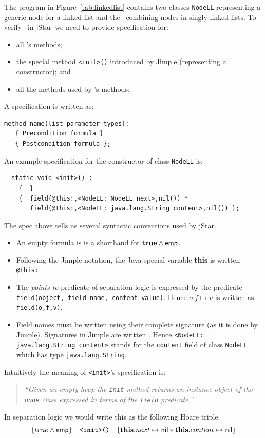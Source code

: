 \documentclass[11pt]{article}
\newcommand{\jStar}{{\sf jStar}}
\newcommand{\psto}{\mapsto}
\newcommand{\emp}{{\sf emp}}
\newcommand{\nil}{{\sf nil}}
\newcommand{\true}{\mathbf{true}}
\newcommand{\this}{\mathbf{this}}
\begin{document}
The program in Figure~\ref{tab:linkedlist} contains two classes
{\tt NodeLL}  representing a generic node for a linked list
and the \linkedlist \  combining nodes in 
singly-linked lists. To verify  \linkedlist \ in \jStar \ we
need to provide specification for:
\begin{itemize}
\item all
\linkedlist's methods;
\item the special method {\tt <init>()} introduced by Jimple
  (representing a constructor); and
\item  all the methods used by \linkedlist{}'s methods;
\end{itemize}
A specification is written as:
\begin{verbatim}
method_name(list parameter types): 
   { Precondition formula } 
   { Postcondition formula };
\end{verbatim}
An example specification for the constructor of class {\tt NodeLL} is:
\begin{verbatim}
  static void <init>() : 
    {  } 
    {  field(@this:,<NodeLL: NodeLL next>,nil()) * 
       field(@this:,<NodeLL: java.lang.String content>,nil()) };
\end{verbatim}
%
The spec above tells us several syntactic conventions used by \jStar.
\begin{itemize}
\item An empty formula is is a shorthand for $\true \wedge \emp$.
\item Following the Jimple notation, the Java special variable {\bf
    this} is written {\tt @this:}
\item The {\em points-to} predicate of separation logic is expressed by the
  predicate {\tt field(object, field name, content value)}. Hence 
  $o.f\psto v$ is written as {\tt field(o,f,v)}.
\item Field names must be written using their complete signature (as
  it is done by Jimple). Signatures in Jimple are  written {\tt <ClassName: TypeOfField NameOfField>}.
  Hence {\tt <NodeLL: java.lang.String content>} stands for the {\tt content} field of class {\tt NodeLL} 
  which has type {\tt java.lang.String}.
\end{itemize}
Intuitively the meaning of {\tt <init>}'s specification is:
\begin{quote}
\it
 ``Given an
empty heap the {\tt init} method returns an instance object of the {\tt node}
class expressed in terms of the {\tt field} predicate.''
\end{quote}
In separation
logic we would write this as the following Hoare triple:
\[
\{ true \wedge \emp \} \quad \texttt{<init>()} \quad \{ \this.next \psto \nil * \this.content \psto \nil \}
\]
\end{document}
